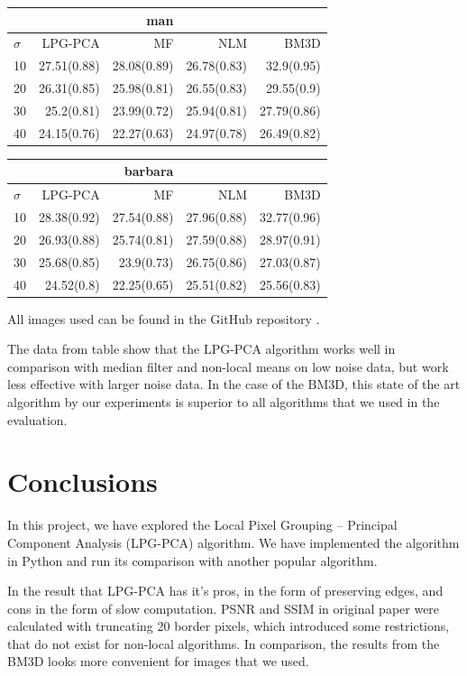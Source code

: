 {\begin{minipage}{.5\linewidth}
\begin{tabular}{lrrrr}
\toprule &&man\\ \midrule
$\sigma$&LPG-PCA&MF&NLM&BM3D\\
\midrule
10&27.51(0.88)&28.08(0.89)&26.78(0.83)&32.9(0.95)\\
20&26.31(0.85)&25.98(0.81)&26.55(0.83)&29.55(0.9)\\
30&25.2(0.81)&23.99(0.72)&25.94(0.81)&27.79(0.86)\\
40&24.15(0.76)&22.27(0.63)&24.97(0.78)&26.49(0.82)\\
\bottomrule
\end{tabular}
\end{minipage}
\noindent\begin{minipage}{.5\linewidth}
\begin{tabular}{lrrrr}
\toprule &&barbara\\ \midrule
$\sigma$&LPG-PCA&MF&NLM&BM3D\\
\midrule
10&28.38(0.92)&27.54(0.88)&27.96(0.88)&32.77(0.96)\\
20&26.93(0.88)&25.74(0.81)&27.59(0.88)&28.97(0.91)\\
30&25.68(0.85)&23.9(0.73)&26.75(0.86)&27.03(0.87)\\
40&24.52(0.8)&22.25(0.65)&25.51(0.82)&25.56(0.83)\\
\bottomrule
\end{tabular}
\end{minipage}
}

All images used can be found in the GitHub repository \cite{our_github}.

The data from table show that the LPG-PCA algorithm works well in comparison with median filter and non-local means on low noise data, but work less effective with larger noise data. In the case of the BM3D, this state of the art algorithm by our experiments is superior to all algorithms that we used in the evaluation.

\section{Conclusions}
In this project, we have explored the Local Pixel Grouping – Principal Component Analysis (LPG-PCA) algorithm. We have implemented the algorithm in Python and run its comparison with another popular algorithm. 

In the result that LPG-PCA has it's pros, in the form of preserving edges, and cons in the form of slow computation. PSNR and SSIM in original paper were calculated with truncating 20 border pixels, which introduced some restrictions, that do not exist for non-local algorithms. In comparison, the results from the BM3D looks more convenient for images that we used.

